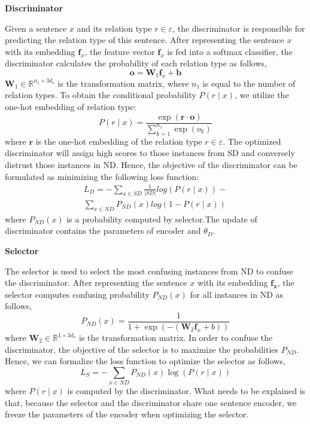 \documentclass[conference]{IEEEtran}
\begin{document}
\textbf{Discriminator}

Given a sentence $x$ and its relation type $r \in \varepsilon$, the discriminator is responsible for predicting the relation type of this sentence.
After representing the sentence $x$ with its embedding $\mathbf{f}_x$, the feature vector $\mathbf{f}_x$ is fed into a softmax classifier, the discriminator calculates the probability of each relation type as follows, 
\begin{equation}
  \mathbf{o} = \mathbf{W}_1\mathbf{f}_x+\mathbf{b}
\end{equation}
$\mathbf{W}_1 \in \mathbb{R}^{n_{1}\times 3d_s}$ is the transformation matrix, where $n_{1}$ is equal to the number of relation types.
To obtain the conditional probability $P\left(r\mid x\right)$, we utilize the one-hot embedding of relation type:
\begin{equation}
  P\left(r\mid x\right) = \frac{\exp\left ( \mathbf{r}\cdot\mathbf{o} \right ) }{\sum_{k=1}^{n_{1}}\exp\left ( o_{k} \right )}
\end{equation}
where $\mathbf{r}$ is the one-hot embedding of the relation type $r\in \varepsilon$.
The optimized discriminator will assign high scores to those instances from SD and conversely distrust those instances in ND.
Hence, the objective of the discriminator can be formulated as minimizing the following loss function:
\begin{equation}
\begin{aligned}
  L_{D} = -\sum_{x\in SD}\frac{1}{\left | SD \right |}log\left ( P(r\mid x) \right ) -\\
  \sum_{x\in ND}P_{ND}(x)log(1-P(r\mid x))
\end{aligned}
\end{equation}
where $P_{ND}(x)$ is a probability computed by selector.The update of discriminator contains the parameters of encoder and $\theta_{D}$.

\textbf{Selector}

The selector is used to select the most confusing instances from ND to confuse the discriminator.
After representing the sentence $x$ with its embedding $\mathbf{f_{x}}$, the selector computes confusing probability $P_{ND}(x)$ for all instances in ND as follows, 
\begin{equation}
  P_{ND}(x) = \frac{1}{1+\exp(-(\mathbf{W}_2\mathbf{f}_x + b))}
\end{equation} 
where $\mathbf{W}_2 \in \mathbb{R}^{1\times3d_{s}}$ is the transformation matrix. 
In order to confuse the discriminator, the objective of the selector is to maximize the probabilities $P_{ND}$.
Hence, we can formalize the loss function to optimize the selector as follows, 
\begin{equation}
  L_{S} = -\sum_{x\in ND}P_{ND}(x)\log(P(r\mid x))
\end{equation}
where $P(r\mid x)$ is computed by the discriminator.
What needs to be explained is that, because the selector and the discriminator share one sentence encoder, we freeze the parameters of the encoder when optimizing the selector.
\end{document}
